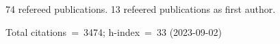 74 refereed publications. 13 refeered publications as first author.

Total citations~=~3474; h-index~=~33 (2023-09-02)